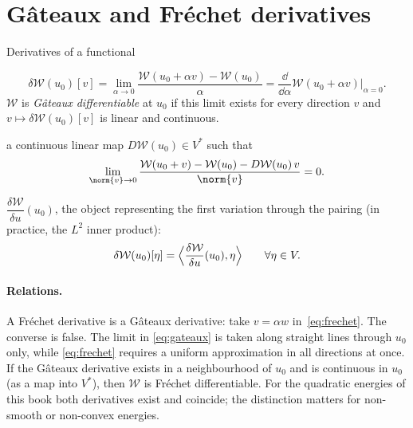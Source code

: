 \section{G\^ateaux and Fr\'echet derivatives}
\begin{gbox}{Derivatives of a functional}
%
\begin{description}[style=nextline,leftmargin=1em,font=\sffamily\bfseries]
\item[G\^ateaux (weak, directional) derivative]
\begin{equation}\label{eq:gateaux}
  \delta\mathcal W(u_0)[v]=\lim_{\alpha\to0}\frac{\mathcal W(u_0+\alpha v)-\mathcal W(u_0)}{\alpha}
  =\frac{\dd}{\dd\alpha}\mathcal W(u_0+\alpha v)\Big|_{\alpha=0} .
\end{equation}
$\mathcal W$ is \emph{G\^ateaux differentiable} at $u_0$ if this limit exists for
every direction $v$ and $v\mapsto\delta\mathcal W(u_0)[v]$ is linear and
continuous.
\item[Fr\'echet (strong) derivative]
a continuous linear map $D\mathcal W(u_0)\in V^\ast$ such that
\begin{equation}\label{eq:frechet}
  \lim_{\norm{v}\to0}\frac{\mathcal W(u_0+v)-\mathcal W(u_0)-D\mathcal W(u_0)\,v}{\norm{v}}=0 .
\end{equation}
\item[Functional derivative]
$\dfrac{\delta\mathcal W}{\delta u}(u_0)$, the object representing the first
variation through the pairing (in practice, the $L^2$ inner product):
\begin{equation}\label{eq:functional-derivative}
  \delta\mathcal W(u_0)[\eta]=\Bigl\langle\frac{\delta\mathcal W}{\delta u}(u_0),\eta\Bigr\rangle
  \qquad\forall\eta\in V .
\end{equation}
\end{description}
\end{gbox}

\paragraph{Relations.} A Fr\'echet derivative is a G\^ateaux derivative: take
$v=\alpha w$ in~\eqref{eq:frechet}. The converse is false. The limit in
\eqref{eq:gateaux} is taken along straight lines through $u_0$ only, while
\eqref{eq:frechet} requires a uniform approximation in all directions at
once. If the G\^ateaux derivative exists in a neighbourhood of $u_0$ and is
continuous in $u_0$ (as a map into $V^\ast$), then $\mathcal W$ is Fr\'echet
differentiable. For the quadratic energies of this book both derivatives
exist and coincide; the distinction matters for non-smooth or non-convex
energies.


